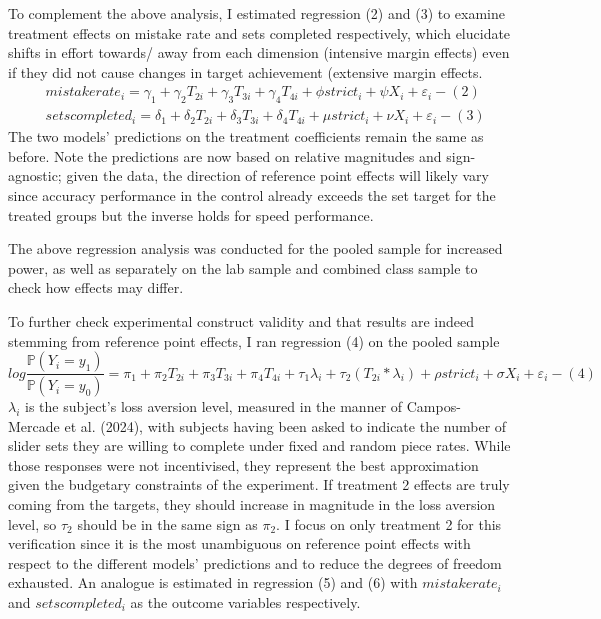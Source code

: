 \documentclass[
  12,
  letterpaper,
  DIV=11,
  numbers=noendperiod]{scrartcl}
\begin{document}
To complement the above analysis, I estimated regression (2) and (3) to
examine treatment effects on mistake rate and sets completed
respectively, which elucidate shifts in effort towards/ away from each
dimension (intensive margin effects) even if they did not cause changes
in target achievement (extensive margin effects. \[
\begin{aligned}
& mistakerate_i = \gamma_1 + \gamma_2 T_{2i} + \gamma_3 T_{3i} + \gamma_4 T_{4i} + \phi strict_i + \psi X_i + \varepsilon_i -(2)
\\
& setscompleted_i = \delta_1 + \delta_2 T_{2i} + \delta_3 T_{3i} + \delta_4 T_{4i} + \mu strict_i + \nu X_i + \varepsilon_i -(3)
\end{aligned}
\] The two models' predictions on the treatment coefficients remain the
same as before. Note the predictions are now based on relative
magnitudes and sign-agnostic; given the data, the direction of reference
point effects will likely vary since accuracy performance in the control
already exceeds the set target for the treated groups but the inverse
holds for speed performance.

The above regression analysis was conducted for the pooled sample for
increased power, as well as separately on the lab sample and combined
class sample to check how effects may differ.

To further check experimental construct validity and that results are
indeed stemming from reference point effects, I ran regression (4) on
the pooled sample \[
log \frac {\mathbb{P}(Y_i = y_1)}{\mathbb{P}(Y_i = y_0)} = \pi_1 + \pi_2 T_{2i} + \pi_3 T_{3i} + \pi_4 T_{4i} + \tau_1 \lambda_i + \tau_2(T_{2i}*\lambda_i) + \rho strict_i + \sigma X_i + \varepsilon_i -(4)
\] \(\lambda_i\) is the subject's loss aversion level, measured in the
manner of Campos-Mercade et al. (2024), with subjects having been asked
to indicate the number of slider sets they are willing to complete under
fixed and random piece rates. While those responses were not
incentivised, they represent the best approximation given the budgetary
constraints of the experiment. If treatment 2 effects are truly coming
from the targets, they should increase in magnitude in the loss aversion
level, so \(\tau_2\) should be in the same sign as \(\pi_2\). I focus on
only treatment 2 for this verification since it is the most unambiguous
on reference point effects with respect to the different models'
predictions and to reduce the degrees of freedom exhausted. An analogue
is estimated in regression (5) and (6) with \(mistakerate_i\) and
\(setscompleted_i\) as the outcome variables respectively.
\end{document}
